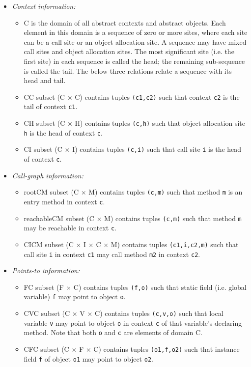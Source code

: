 \begin{itemize}
\item
{\it Context information:}
\begin{itemize}
\item
C is the domain of all abstract contexts and abstract objects.  Each
element in this domain is a sequence of zero or more sites, where each site can
be a call site or an object allocation site.  A sequence may have mixed call
sites and object allocation sites.  The most significant site (i.e. the first
site) in each sequence is called the head; the remaining sub-sequence is called
the tail.  The below three relations relate a sequence with its head and tail.
\item
CC subset (C $\times$ C) contains tuples \texttt{(c1,c2)} such that context
\texttt{c2} is the tail of context \texttt{c1}.
\item
CH subset (C $\times$ H) contains tuples \texttt{(c,h)} such that object
allocation site \texttt{h} is the head of context \texttt{c}.
\item
CI subset (C $\times$ I) contains tuples \texttt{(c,i)} such that call site
\texttt{i} is the head of context \texttt{c}.
\end{itemize}
\item
{\it Call-graph information:}
\begin{itemize}
\item
rootCM subset (C $\times$ M) contains tuples \texttt{(c,m)} such that method
\texttt{m} is an entry method in context \texttt{c}.
\item
reachableCM subset (C $\times$ M) contains tuples \texttt{(c,m)} such that
method \texttt{m} may be reachable in context \texttt{c}.
\item
CICM subset (C $\times$ I $\times$ C $\times$ M) contains tuples
\texttt{(c1,i,c2,m)} such that call site \texttt{i} in context \texttt{c1} may
call method \texttt{m2} in context \texttt{c2}.
\end{itemize}
\item
{\it Points-to information:}
\begin{itemize}
\item
FC subset (F $\times$ C) contains tuples \texttt{(f,o)} such that static field
(i.e. global variable) \texttt{f} may point to object \texttt{o}.
\item
CVC subset (C $\times$ V $\times$ C) contains tuples \texttt{(c,v,o)} such that
local variable \texttt{v} may point to object \texttt{o} in context \texttt{c}
of that variable's declaring method.  Note that both \texttt{o} and \texttt{c}
are elements of domain C.
\item
CFC subset (C $\times$ F $\times$ C) contains tuples \texttt{(o1,f,o2)} such
that instance field \texttt{f} of object \texttt{o1} may point to object
\texttt{o2}.  \end{itemize}
\end{itemize}

